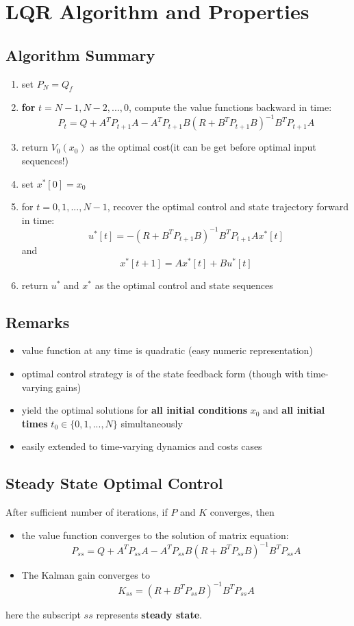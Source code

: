\documentclass[10pt,a4paper,oneside]{article}
\begin{document}
\section{LQR Algorithm and Properties}

\subsection{Algorithm Summary}

\begin{enumerate}
	\item set $P_N=Q_f$
	\item \textbf{for} $t=N-1,N-2,...,0$, compute the value functions backward in time:
	\[
	P_t=Q+A^T P_{t+1} A - A^T P_{t+1} B (R+B^TP_{t+1}B)^{-1} B^T P_{t+1} A
	\]
	\item return $V_0(x_0)$ as the optimal cost(it can be get before optimal input sequences!)
	\item set $x^*[0]=x_0$
	\item for $t=0,1,...,N-1$, recover the optimal control and state trajectory forward in time:
	\[
	u^*[t]=-(R+B^TP_{t+1}B)^{-1}B^TP_{t+1}Ax^*[t]
	\]
	and
	\[
	x^*[t+1]=Ax^*[t]+Bu^*[t]
	\]
	\item return $u^*$ and $x^*$ as the optimal control and state sequences
\end{enumerate}

\subsection{Remarks}

\begin{itemize}
	\item value function at any time is quadratic (easy numeric representation)
	\item optimal control strategy is of the state feedback form (though with time-varying gains)
	\item yield the optimal solutions for \textbf{all initial conditions} $x_0$ and \textbf{all initial times} $t_0\in\{0,1,...,N\}$ simultaneously
	\item easily extended to time-varying dynamics and costs cases
\end{itemize}

\subsection{Steady State Optimal Control}
After sufficient number of iterations, if $P$ and $K$ converges, then
\begin{itemize}
	\item the value function converges to the solution of matrix equation:
	\[
	P_{ss}=Q+A^TP_{ss}A - A^TP_{ss}B(R+B^TP_{ss}B)^{-1}B^TP_{ss}A
	\]
	\item The Kalman gain converges to
	\[
	K_{ss} =(R+B^TP_{ss}B)^{-1}B^TP_{ss}A
	\]
\end{itemize}
here the subscript $ss$ represents \textbf{steady state}.
\end{document}
